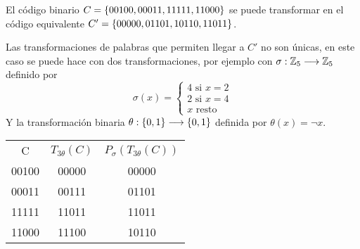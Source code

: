 \begin{example}
	El código binario $C=\left\{00100, 00011, 11111, 11000\right\}$ se puede transformar en el código equivalente  $C'=\left\{00000, 01101, 10110, 11011\right\}$.

	Las transformaciones de palabras que permiten llegar a $C'$ no son únicas, en este caso se puede hace con dos transformaciones, por ejemplo con $\sigma:\mathbb{Z}_5\longrightarrow \mathbb{Z}_5$ definido por
	\[
		\sigma(x)=\begin{cases}
			          4 \text{ si } x=2\\
			          2 \text{ si } x=4\\
			          x \text{ resto}
		\end{cases}
	\]
	Y la transformación binaria $\theta:\left\{0, 1\right\}\longrightarrow \left\{0, 1\right\}$ definida por $\theta(x)=\neg x$.
	\begin{center}
		\begin{tabular}{ccc}
			C     & $T_{3\theta}(C)$ & $P_\sigma(T_{3\theta}(C))$ \\
			00100 & 00000             & 00000                       \\
			00011 & 00111             & 01101                       \\
			11111 & 11011             & 11011                       \\
			11000 & 11100             & 10110
		\end{tabular}
	\end{center}
\end{example}